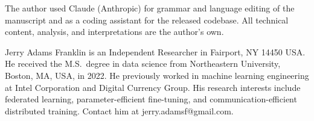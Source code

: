 \documentclass{ieeetj}
\begin{document}
The author used Claude (Anthropic) for grammar and language editing of the manuscript and as a coding assistant for the released codebase. All technical content, analysis, and interpretations are the author's own.




\begin{IEEEbiographynophoto}{Jerry Adams Franklin}
is an Independent Researcher in Fairport, NY 14450 USA.
He received the M.S.\ degree in data science from Northeastern University, Boston, MA, USA, in 2022.
He previously worked in machine learning engineering at Intel Corporation
and Digital Currency Group.
His research interests include federated learning, parameter-efficient
fine-tuning, and communication-efficient distributed training.
Contact him at jerry.adamsf@gmail.com.
\end{IEEEbiographynophoto}

\appendices
\renewcommand{\thetable}{S\arabic{table}}
\renewcommand{\thefigure}{S\arabic{figure}}
\setcounter{table}{0}
\setcounter{figure}{0}

\end{document}
